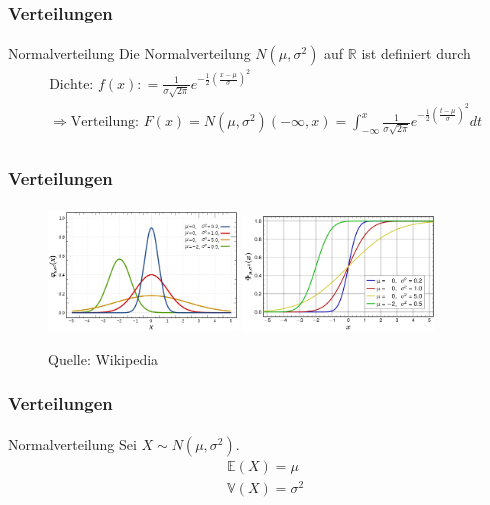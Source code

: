 \documentclass{beamer}
\begin{document}
\begin{frame}
    \frametitle{Verteilungen}
\framesubtitle{}

\begin{block}{Normalverteilung}
Die Normalverteilung $N{(\mu,\sigma^2)}$ auf $\mathbb{R}$ ist definiert durch
\begin{align*}
& \text{Dichte: } f (x) : = \frac 1{\sigma \sqrt{2\pi}}e^{- \frac {1}{2} (\frac{x- \mu}{ \sigma})^2} \\
&  \Rightarrow \text{Verteilung: } F(x) = N{(\mu,\sigma^2)}(-\infty , x) =  \int_{-\infty}^{x}  \frac 1{\sigma \sqrt{2\pi}}e^{- \frac {1}{2} (\frac{t- \mu}{ \sigma})^2}dt\\
\end{align*}

\end{block}
 \end{frame}



\begin{frame}
    \frametitle{ Verteilungen}
\framesubtitle{}
\begin{figure}[htp]
      \centering
    \includegraphics[width=0.45\textwidth]{img/normal}
    \includegraphics[width=0.45\textwidth]{img/normaldist}
      \caption{Quelle: Wikipedia}
\end{figure}

 \end{frame}


\begin{frame}
    \frametitle{Verteilungen}
\framesubtitle{}

\begin{block}{Normalverteilung}
Sei $X \sim N(\mu, \sigma^2)$.
\begin{align*}
& \mathbb{E}(X) = \mu \\
& \mathbb{V}(X) = \sigma^2
\end{align*}
\end{block}
 \end{frame}
\end{document}
